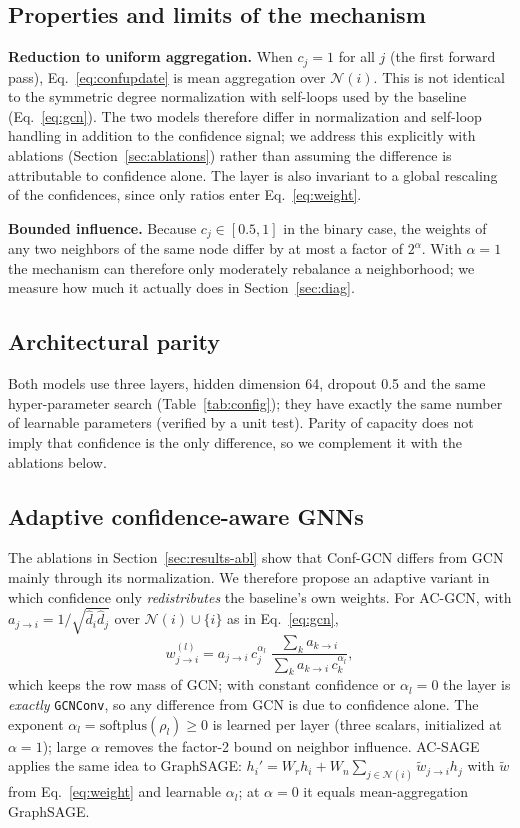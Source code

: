 \documentclass[conference]{IEEEtran}
\begin{document}
\subsection{Properties and limits of the mechanism}
\label{sec:props}
\textbf{Reduction to uniform aggregation.} When $c_j=1$ for all $j$ (the first forward pass), Eq.~\eqref{eq:confupdate} is mean aggregation over $\mathcal{N}(i)$. This is not identical to the symmetric degree normalization with self-loops used by the baseline (Eq.~\ref{eq:gcn}). The two models therefore differ in normalization and self-loop handling in addition to the confidence signal; we address this explicitly with ablations (Section~\ref{sec:ablations}) rather than assuming the difference is attributable to confidence alone. The layer is also invariant to a global rescaling of the confidences, since only ratios enter Eq.~\eqref{eq:weight}.

\textbf{Bounded influence.} Because $c_j\in[0.5,1]$ in the binary case, the weights of any two neighbors of the same node differ by at most a factor of $2^{\alpha}$. With $\alpha=1$ the mechanism can therefore only moderately rebalance a neighborhood; we measure how much it actually does in Section~\ref{sec:diag}.

\subsection{Architectural parity}
Both models use three layers, hidden dimension 64, dropout 0.5 and the same hyper-parameter search (Table~\ref{tab:config}); they have exactly the same number of learnable parameters (verified by a unit test). Parity of capacity does not imply that confidence is the only difference, so we complement it with the ablations below.

\subsection{Adaptive confidence-aware GNNs}
\label{sec:adaptive}
The ablations in Section~\ref{sec:results-abl} show that Conf-GCN differs from GCN mainly through its normalization. We therefore propose an adaptive variant in which confidence only \emph{redistributes} the baseline's own weights. For AC-GCN, with $a_{j\rightarrow i}=1/\sqrt{\hat d_i\hat d_j}$ over $\mathcal{N}(i)\cup\{i\}$ as in Eq.~\eqref{eq:gcn},
\begin{equation}
w^{(l)}_{j\rightarrow i}=a_{j\rightarrow i}\,c_j^{\alpha_l}\;\frac{\sum_{k}a_{k\rightarrow i}}{\sum_{k}a_{k\rightarrow i}\,c_k^{\alpha_l}},
\label{eq:acgcn}
\end{equation}
which keeps the row mass of GCN; with constant confidence or $\alpha_l=0$ the layer is \emph{exactly} \texttt{GCNConv}, so any difference from GCN is due to confidence alone. The exponent $\alpha_l=\mathrm{softplus}(\rho_l)\ge0$ is learned per layer (three scalars, initialized at $\alpha=1$); large $\alpha$ removes the factor-2 bound on neighbor influence. AC-SAGE applies the same idea to GraphSAGE: $h_i'=W_r h_i+W_n\sum_{j\in\mathcal{N}(i)}\tilde w_{j\rightarrow i}h_j$ with $\tilde w$ from Eq.~\eqref{eq:weight} and learnable $\alpha_l$; at $\alpha=0$ it equals mean-aggregation GraphSAGE.
\end{document}
